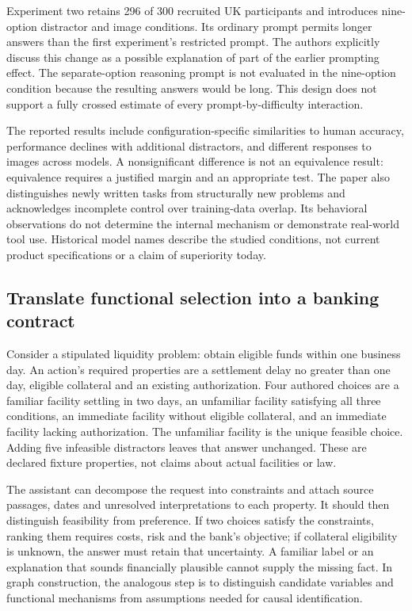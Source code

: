 Experiment two retains 296 of 300 recruited UK participants and introduces nine-option distractor and image conditions. Its ordinary prompt permits longer answers than the first experiment's restricted prompt. The authors explicitly discuss this change as a possible explanation of part of the earlier prompting effect. The separate-option reasoning prompt is not evaluated in the nine-option condition because the resulting answers would be long. This design does not support a fully crossed estimate of every prompt-by-difficulty interaction.\citep{exec24_affordance_original}

The reported results include configuration-specific similarities to human accuracy, performance declines with additional distractors, and different responses to images across models. A nonsignificant difference is not an equivalence result: equivalence requires a justified margin and an appropriate test. The paper also distinguishes newly written tasks from structurally new problems and acknowledges incomplete control over training-data overlap. Its behavioral observations do not determine the internal mechanism or demonstrate real-world tool use. Historical model names describe the studied conditions, not current product specifications or a claim of superiority today.\citep{exec24_affordance_original,exec24_affordance_fuzzing_reference}

\subsection{Translate functional selection into a banking contract}
Consider a stipulated liquidity problem: obtain eligible funds within one business day. An action's required properties are a settlement delay no greater than one day, eligible collateral and an existing authorization. Four authored choices are a familiar facility settling in two days, an unfamiliar facility satisfying all three conditions, an immediate facility without eligible collateral, and an immediate facility lacking authorization. The unfamiliar facility is the unique feasible choice. Adding five infeasible distractors leaves that answer unchanged. These are declared fixture properties, not claims about actual facilities or law.\citep{exec24_affordance_fuzzing_reference}

The assistant can decompose the request into constraints and attach source passages, dates and unresolved interpretations to each property. It should then distinguish feasibility from preference. If two choices satisfy the constraints, ranking them requires costs, risk and the bank's objective; if collateral eligibility is unknown, the answer must retain that uncertainty. A familiar label or an explanation that sounds financially plausible cannot supply the missing fact. In graph construction, the analogous step is to distinguish candidate variables and functional mechanisms from assumptions needed for causal identification.\citep{exec24_affordance_fuzzing_reference}

